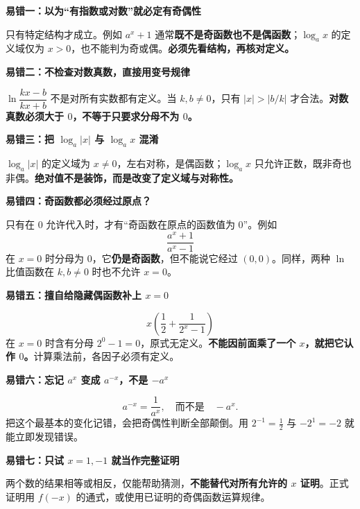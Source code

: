 \clearpage
\begin{trapbox}
\textbf{\textcolor{CTrap}{易错一：以为“有指数或对数”就必定有奇偶性}}

只有特定结构才成立。例如 $a^x+1$ 通常\textbf{既不是奇函数也不是偶函数}；$\log_a x$ 的定义域仅为 $x>0$，也不能判为奇或偶。\textbf{必须先看结构，再核对定义。}

\textbf{\textcolor{CTrap}{易错二：不检查对数真数，直接用变号规律}}

$\ln\dfrac{kx-b}{kx+b}$ 不是对所有实数都有定义。当 $k,b\ne0$，只有 $|x|>|b/k|$ 才合法。\textbf{对数真数必须大于 $0$，不等于只要求分母不为 $0$。}

\end{trapbox}
\clearpage
\begin{trapbox}
\textbf{\textcolor{CTrap}{易错三：把 $\log_a|x|$ 与 $\log_a x$ 混淆}}


$\log_a|x|$ 的定义域为 $x\ne0$，左右对称，是偶函数；$\log_a x$ 只允许正数，既非奇也非偶。\textbf{绝对值不是装饰，而是改变了定义域与对称性。}
\end{trapbox}
\clearpage
\begin{trapbox}
\textbf{\textcolor{CTrap}{易错四：奇函数都必须经过原点？}}

只有在 $0$ 允许代入时，才有“奇函数在原点的函数值为 $0$”。例如
\[
 \frac{a^x+1}{a^x-1}
\]
在 $x=0$ 时分母为 $0$，它\textbf{仍是奇函数}，但不能说它经过 $(0,0)$。同样，两种 $\ln$ 比值函数在 $k,b\ne0$ 时也不允许 $x=0$。

\textbf{\textcolor{CTrap}{易错五：擅自给隐藏偶函数补上 $x=0$}}

\[
 x\left(\frac12+\frac1{2^x-1}\right)
\]
在 $x=0$ 时含有分母 $2^0-1=0$，原式无定义。\textbf{不能因前面乘了一个 $x$，就把它认作 $0$。}计算乘法前，各因子必须有定义。
\end{trapbox}
\clearpage
\begin{trapbox}
\textbf{\textcolor{CTrap}{易错六：忘记 $a^x$ 变成 $a^{-x}$，不是 $-a^x$}}

\[
 \boxed{a^{-x}=\frac1{a^x}},\quad\text{而不是}\quad -a^x.
\]
把这个最基本的变化记错，会把奇偶性判断全部颠倒。用 $2^{-1}=\tfrac12$ 与 $-2^1=-2$ 就能立即发现错误。

\textbf{\textcolor{CTrap}{易错七：只试 $x=1,-1$ 就当作完整证明}}

两个数的结果相等或相反，仅能帮助猜测，\textbf{不能替代对所有允许的 $x$ 证明}。正式证明用 $f(-x)$ 的通式，或使用已证明的奇偶函数运算规律。

\end{trapbox}
